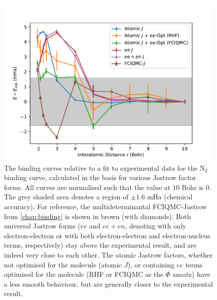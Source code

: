 
\begin{figure}[htbp]
    \centering
    \includegraphics[width=\textwidth]{figures/universal/residuals}
    \caption{The binding curves relative to a fit to experimental data\supercite{leroyAccurate2006} for the N$_2$ binding curve, calculated in the \avtz basis for various Jastrow factor forms. All curves are normalised such that the value at $10$ Bohr is $0$. The grey shaded area denotes a region of $\pm 1.6$ mHa (chemical accuracy). For reference, the multideterminantal FCIQMC-Jastrow from \autoref{chap:binding} is shown in brown (with diamonds). Both universal Jastrow forms ($ee$ and $ee+en$, denoting with only electron-electron or with both electron-electron and electron-nucleus terms, respectively) stay above the experimental result, and are indeed very close to each other. The atomic Jastrow factors, whether not optimised for the molecule (atomic $J$), or containing $ee$ terms optimised for the molecule (RHF or FCIQMC as the $\Phi$ ansatz) have a less smooth behaviour, but are generally closer to the experimental result. }
    \label{fig:binding-universal-experiment}
\end{figure}


